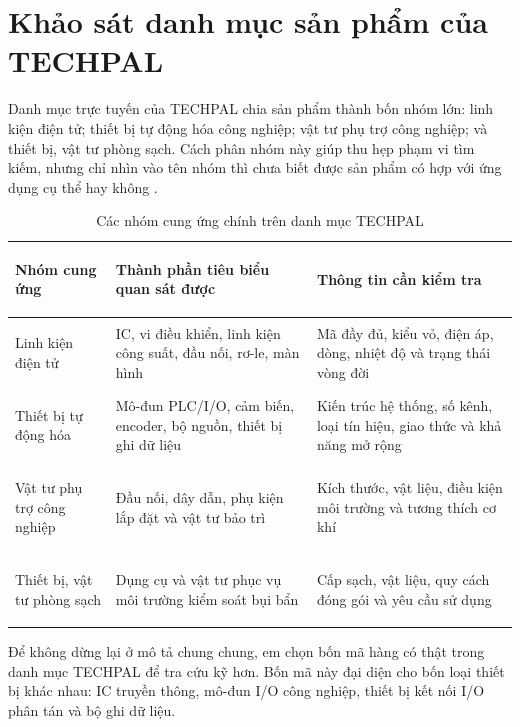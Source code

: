 \section{Khảo sát danh mục sản phẩm của TECHPAL}

Danh mục trực tuyến của TECHPAL chia sản phẩm thành bốn nhóm lớn: linh kiện điện
tử; thiết bị tự động hóa công nghiệp; vật tư phụ trợ công nghiệp; và thiết bị,
vật tư phòng sạch. Cách phân nhóm này
giúp thu hẹp phạm vi tìm kiếm, nhưng chỉ nhìn vào tên nhóm thì chưa biết được
sản phẩm có hợp với ứng dụng cụ thể hay không \cite{techpal-components}.

\begin{table}[H]
\centering
\caption{Các nhóm cung ứng chính trên danh mục TECHPAL}
\label{tab:techpal-categories}
\small
\renewcommand{\arraystretch}{1.1}
\begin{tabularx}{\textwidth}{>{\bfseries\raggedright\arraybackslash}p{4.1cm} >{\raggedright\arraybackslash}X >{\raggedright\arraybackslash}X}
\toprule
Nhóm cung ứng & Thành phần tiêu biểu quan sát được & Thông tin cần kiểm tra \\
\midrule
Linh kiện điện tử & IC, vi điều khiển, linh kiện công suất, đầu nối, rơ-le, màn hình & Mã đầy đủ, kiểu vỏ, điện áp, dòng, nhiệt độ và trạng thái vòng đời \\
Thiết bị tự động hóa & Mô-đun PLC/I/O, cảm biến, encoder, bộ nguồn, thiết bị ghi dữ liệu & Kiến trúc hệ thống, số kênh, loại tín hiệu, giao thức và khả năng mở rộng \\
Vật tư phụ trợ công nghiệp & Đầu nối, dây dẫn, phụ kiện lắp đặt và vật tư bảo trì & Kích thước, vật liệu, điều kiện môi trường và tương thích cơ khí \\
Thiết bị, vật tư phòng sạch & Dụng cụ và vật tư phục vụ môi trường kiểm soát bụi bẩn & Cấp sạch, vật liệu, quy cách đóng gói và yêu cầu sử dụng \\
\bottomrule
\end{tabularx}
\end{table}

Để không dừng lại ở mô tả chung chung, em chọn bốn mã hàng có thật trong danh
mục TECHPAL \cite{techpal-components} để tra cứu kỹ hơn. Bốn mã này đại diện cho bốn loại thiết bị khác
nhau: IC truyền thông, mô-đun I/O công nghiệp, thiết bị kết nối I/O phân tán và
bộ ghi dữ liệu.

